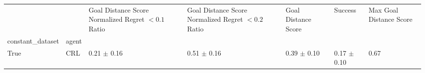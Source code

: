 \begin{tabular}{lllllll}
\toprule
 &  & Goal Distance Score Normalized Regret $< 0.1$ Ratio & Goal Distance Score Normalized Regret $< 0.2$ Ratio & Goal Distance Score & Success & Max Goal Distance Score \\
constant_dataset & agent &  &  &  &  &  \\
\midrule
True & CRL & 0.21 $\pm$ 0.16 & 0.51 $\pm$ 0.16 & 0.39 $\pm$ 0.10 & 0.17 $\pm$ 0.10 & 0.67 \\
\cline{1-7}
\bottomrule
\end{tabular}
